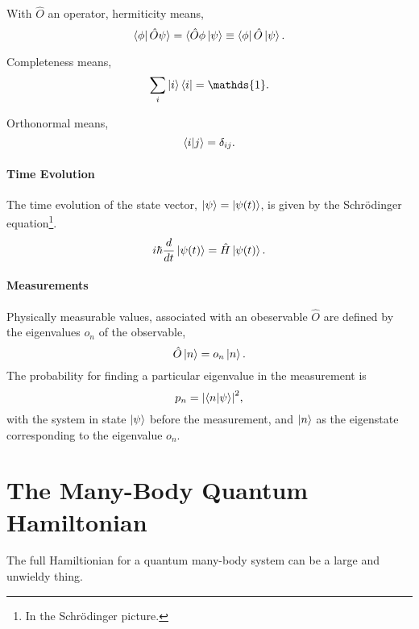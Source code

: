     With $\hat{O}$ an operator, hermiticity means,
    \begin{equation}
        \bra{\phi}\hat{O}\psi\rangle = \langle\hat{O}\phi\ket{\psi} \equiv \bra{\phi} \hat{O} \ket{\psi}.
    \end{equation}

    Completeness means,
    \begin{equation}
        \sum_i \ket{i}\bra{i} = \mathds{1}.
    \end{equation}

    Orthonormal means,
    \begin{equation}
        \braket{i}{j} = \delta_{ij}.
    \end{equation}

    \paragraph{Time Evolution}
    The time evolution of the state vector, $\ket{\psi} = \ket{\psi (t)}$, is given by the Schrödinger
    equation\footnote{In the Schrödinger picture.}.
    \begin{equation}
        i\hbar \frac{d}{dt} \ket{\psi (t)} = \hat{H} \ket{\psi (t)}.
    \end{equation}

    \paragraph{Measurements}
    Physically measurable values, associated with an obeservable $\hat{O}$ are defined by the 
    eigenvalues $o_n$ of the observable,
    \begin{equation}
        \hat{O}\ket{n} = o_n\ket{n}.
    \end{equation}
    The probability for finding a particular eigenvalue in the measurement is
    \begin{equation}
        p_n = \abs{\braket{n}{\psi}}^2,
    \end{equation}
    with the system in state $\ket{\psi}$ before the measurement, and $\ket{n}$ as the 
    eigenstate corresponding to the eigenvalue $o_n$.

\section{The Many-Body Quantum Hamiltonian}

    The full Hamiltionian for a quantum many-body system can be a large 
    and unwieldy thing.

